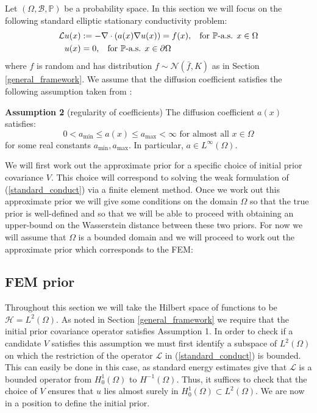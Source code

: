 Let $(\Omega,\mathcal{B},\mathbb{P})$ be a probability space. In this section we will focus on the following standard elliptic stationary conductivity problem:
\begin{align}
    \label{standard_conduct}
    \begin{split}
        \mathcal{L}u(x) &:= -\nabla\cdot(a(x)\nabla u(x))=f(x), \hspace{0.3cm} \text{for } \mathbb{P}\text{-a.s. } x\in\Omega \\
        u(x) &= 0, \hspace{0.3cm} \text{for } \mathbb{P}\text{-a.s. } x\in\partial\Omega
    \end{split}
\end{align}
where $f$ is random and has distribution $f\sim\mathcal{N}(\bar{f},K)$ as in Section \textcolor{blue}{\ref{general_framework}}. We assume that the diffusion coefficient satisfies the following assumption taken from \textcolor{blue}{\citep{lord2014introduction}}:

\noindent \textbf{Assumption 2} (regularity of coefficients) The diffusion coefficient $a(x)$ satisfies:
\begin{equation}
    \label{regularity_of_coeff}
    0<a_{\text{min}}\leq a(x)\leq a_{\text{max}}<\infty \text{ for almost all } x\in\Omega
\end{equation}
for some real constants $a_{\text{min}},a_{\text{max}}$. In particular, $a\in L^{\infty}(\Omega)$.

We will first work out the approximate prior for a specific choice of initial prior covariance $V$. This choice will correspond to solving the weak formulation of (\ref{standard_conduct}) via a finite element method. Once we work out this approximate prior we will give some conditions on the domain $\Omega$ so that the true prior is well-defined and so that we will be able to proceed with obtaining an upper-bound on the Wasserstein distance between these two priors. For now we will assume that $\Omega$ is a bounded domain and we will proceed to work out the approximate prior which corresponds to the FEM:

\subsection{FEM prior}

Throughout this section we will take the Hilbert space of functions to be $\mathcal{H}=L^{2}(\Omega)$. As noted in Section \textcolor{blue}{\ref{general_framework}} we require that the initial prior covariance operator satisfies Assumption 1. In order to check if a candidate $V$ satisfies this assumption we must first identify a subspace of $L^{2}(\Omega)$ on which the restriction of the operator $\mathcal{L}$ in (\ref{standard_conduct}) is bounded. This can easily be done in this case, as standard energy estimates give that $\mathcal{L}$ is a bounded operator from $H^{1}_{0}(\Omega)$ to $H^{-1}(\Omega)$. Thus, it suffices to check that the choice of $V$ ensures that $u$ lies almost surely in $H_{0}^{1}(\Omega)\subset L^{2}(\Omega)$. We are now in a position to define the initial prior.

